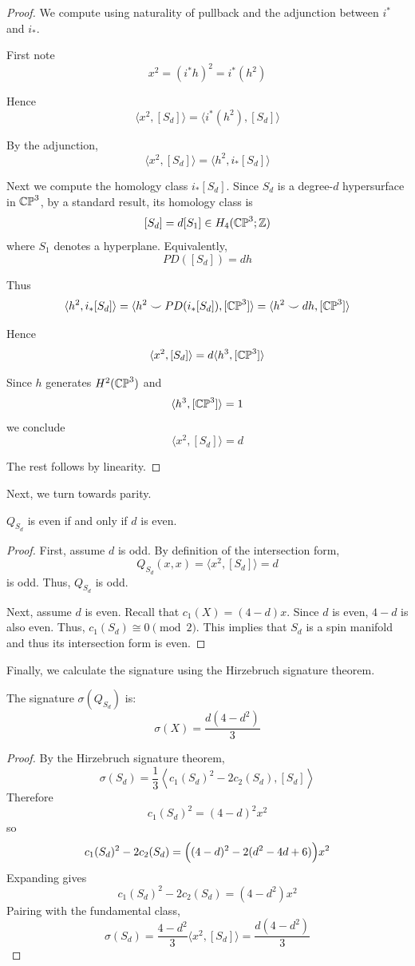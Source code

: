 \documentclass[12pt]{article}
\begin{document}
\begin{proof}
We compute using naturality of pullback and the adjunction between $i^*$ and $i_*$.

First note
\[ x^2=(i^*h)^2 = i^*(h^2) \]

Hence
\[ \langle x^2,[S_d]\rangle = \langle i^*(h^2),[S_d]\rangle \]

By the adjunction,
\[ \langle x^2,[S_d]\rangle = \langle h^2,i_*[S_d]\rangle \]

Next we compute the homology class $i_*[S_d]$. Since $S_d$ is a degree-$d$ hypersurface in $\mathbb{CP}^3$, by a standard result, its homology class is
\[ [S_d] = d[S_1] \in H_4(\mathbb{CP}^3;\mathbb Z) \]
where $S_1$ denotes a hyperplane. Equivalently,
\[ PD([S_d]) = d h \]

Thus 
\[ \langle h^2,i_*[S_d]\rangle = \langle h^2 \smile PD(i_*[S_d]),[\mathbb{CP}^3]\rangle = \langle h^2 \smile d h,[\mathbb{CP}^3]\rangle \]

Hence
\[ \langle x^2,[S_d]\rangle = d \langle h^3,[\mathbb{CP}^3]\rangle \]

Since $h$ generates $H^2(\mathbb{CP}^3)$ and
\[ \langle h^3,[\mathbb{CP}^3]\rangle =1 \]
we conclude
\[ \langle x^2,[S_d]\rangle = d \]

The rest follows by linearity.
\end{proof}

Next, we turn towards parity. 
\begin{lemma}
    $Q_{S_d}$ is even if and only if $d$ is even. 
\end{lemma}
\begin{proof}
    First, assume $d$ is odd. By definition of the intersection form, 
    \[ Q_{S_d}(x, x) = \langle x^2, [S_d]\rangle = d\]
    is odd. Thus, $Q_{S_d}$ is odd. 

    Next, assume $d$ is even. Recall that $c_1(X) = (4-d)x$. Since $d$ is even, $4-d$ is also even. Thus, $c_1(S_d) \cong 0 \pmod{2}$. This implies that $S_d$ is a spin manifold and thus its intersection form is even. 
\end{proof}


Finally, we calculate the signature using the Hirzebruch signature theorem. 
\begin{lemma}
    The signature $\sigma(Q_{S_d})$ is:
    \[ \sigma(X) = \frac{d(4-d^2)}{3}\]    
\end{lemma}

\begin{proof}
    By the Hirzebruch signature theorem,
    \[ \sigma(S_d)=\frac{1}{3}\left\langle c_1(S_d)^2-2c_2(S_d),[S_d]\right\rangle \]
    Therefore
    \[ c_1(S_d)^2=(4-d)^2x^2 \]
    so
    \[ c_1(S_d)^2-2c_2(S_d) = \Bigl((4-d)^2-2(d^2-4d+6)\Bigr)x^2 \]
    Expanding gives
    \[ c_1(S_d)^2-2c_2(S_d)=(4-d^2)x^2 \]
    Pairing with the fundamental class, 
    \[ \sigma(S_d)=\frac{4-d^2}{3}\langle x^2, [S_d] \rangle = \frac{d(4-d^2)}{3}\]
\end{proof}
\end{document}
